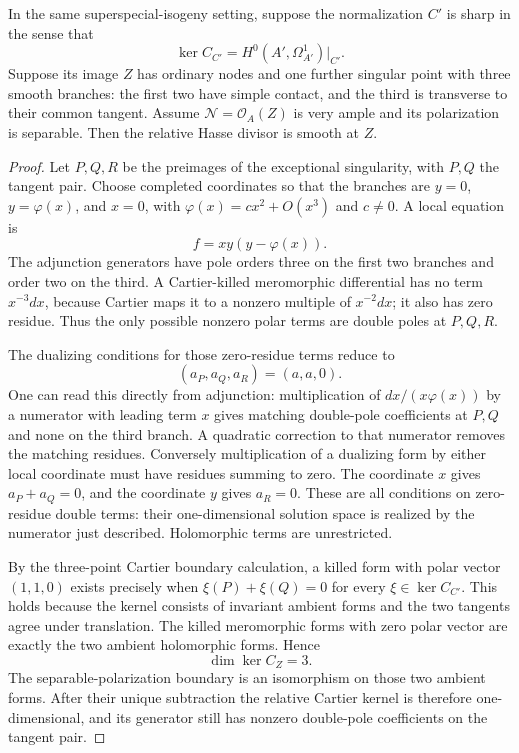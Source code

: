 \begin{lemma}
\label{lem:ss-tangent-triple-bridge}
In the same superspecial-isogeny setting, suppose the normalization
$C'$ is sharp in the sense that
\[
             \ker C_{C'}=H^0(A',\Omega^1_{A'})|_{C'}.
\]
Suppose its image $Z$ has ordinary nodes and one further singular
point with three smooth branches: the first two have simple contact,
and the third is transverse to their common tangent. Assume
$\mathcal N=\mathcal O_A(Z)$ is very ample and its polarization is
separable. Then the relative Hasse divisor is smooth at $Z$.
\end{lemma}
\begin{proof}
Let $P,Q,R$ be the preimages of the exceptional singularity, with
$P,Q$ the tangent pair. Choose completed coordinates so that the
branches are $y=0$, $y=\varphi(x)$, and $x=0$, with
$\varphi(x)=c x^2+O(x^3)$ and $c\ne0$. A local equation is
\[
                         f=xy(y-\varphi(x)).
\]
The adjunction generators have pole orders three on the first
two branches and order two on the third. A Cartier-killed
meromorphic differential has no term $x^{-3}dx$, because Cartier
maps it to a nonzero multiple of $x^{-2}dx$; it also has zero
residue. Thus the only possible nonzero polar terms are double
poles at $P,Q,R$.

The dualizing conditions for those zero-residue terms reduce to
\[
                     (a_P,a_Q,a_R)=(a,a,0).
\]
One can read this directly from adjunction: multiplication of
$dx/(x\varphi(x))$ by a numerator with leading term $x$ gives
matching double-pole coefficients at $P,Q$ and none on the third
branch. A quadratic correction to that numerator removes the
matching residues. Conversely multiplication of a dualizing form
by either local coordinate must have residues summing to zero.
The coordinate $x$ gives $a_P+a_Q=0$, and the coordinate $y$
gives $a_R=0$. These are all conditions on zero-residue double
terms: their one-dimensional solution space is realized by the
numerator just described. Holomorphic terms are unrestricted.

By the three-point Cartier boundary calculation, a killed form
with polar vector $(1,1,0)$ exists precisely when
$\xi(P)+\xi(Q)=0$ for every $\xi\in\ker C_{C'}$.
This holds because the kernel consists of invariant ambient
forms and the two tangents agree under translation. The killed
meromorphic forms with zero polar vector are exactly the two
ambient holomorphic forms. Hence
\[
                        \dim\ker C_Z=3.
\]
The separable-polarization boundary is an isomorphism on those
two ambient forms. After their unique subtraction the relative
Cartier kernel is therefore one-dimensional, and its generator
still has nonzero double-pole coefficients on the tangent pair.


\end{proof}
